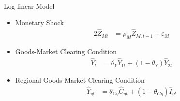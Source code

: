 \documentclass[../quali_slides.tex]{subfiles}
\begin{document}
\begin{frame}[allowframebreaks]{Log-linear Model}
{\begin{itemize}
		\item Monetary Shock
		\begin{alignat}{2}
			\hat{Z}_{Mt} &= \rho_M \hat{Z}_{M,t-1} + \varepsilon_{M} \label{eq_v2:reg-ll-monetary-shock}
		\end{alignat}
		
		\item Goods-Market Clearing Condition
		\begin{align}
			\hat{Y}_{t} &= \theta_{Y} \hat{Y}_{1t} + (1-\theta_{Y}) \hat{Y}_{2t} \label{eq_v2:reg-ll-market-clearing-condition-Yt-3}
		\end{align}
		
		\item Regional Goods-Market Clearing Condition
		\begin{align}
			\hat{Y}_{\eta t} &= \theta_{C\eta} \hat{C}_{\eta t} + (1 - \theta_{C\eta}) \hat{I}_{\eta t} \label{eq_v2:reg-ll-total-yn-2}
		\end{align}
		
	\end{itemize}
	
} %
	
\end{frame}

\begin{comment}


\subsection{Matlab and Dynare}

\begin{frame}{Matlab and Dynare}
	
	\begin{figure}[h!]
		\centering
		\texttt{[image: matlab\_screen]}
		\caption{Matlab and Dynare}
		\label{fig:matlab}
	\end{figure}
	
\end{frame}
	
\end{comment}
\end{document}
